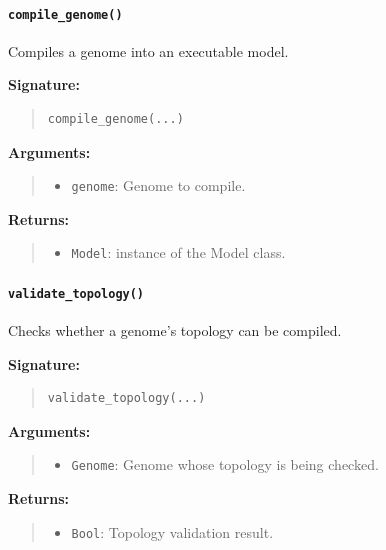 \documentclass[11pt]{article}
\begin{document}
\paragraph{\texttt{compile\_genome()}}

Compiles a genome into an executable model.

\textbf{Signature:}
\begin{quote}
\begin{verbatim}
compile_genome(...)
\end{verbatim}
\end{quote}

\textbf{Arguments:}
\begin{quote}
\begin{itemize}
    \item \texttt{genome}: Genome to compile.
\end{itemize}
\end{quote}

\textbf{Returns:}
\begin{quote}
\begin{itemize}
    \item \texttt{Model}: instance of the Model class.
\end{itemize}
\end{quote}

\paragraph{\texttt{validate\_topology()}}

Checks whether a genome's topology can be compiled.

\textbf{Signature:}
\begin{quote}
\begin{verbatim}
validate_topology(...)
\end{verbatim}
\end{quote}

\textbf{Arguments:}
\begin{quote}
\begin{itemize}
    \item \texttt{Genome}: Genome whose topology is being checked.
\end{itemize}
\end{quote}

\textbf{Returns:}
\begin{quote}
\begin{itemize}
    \item \texttt{Bool}: Topology validation result.
\end{itemize}
\end{quote}
\end{document}
